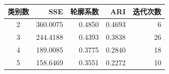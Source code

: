 \begin{tabular}{crrrr}
\toprule
类别数 & SSE & 轮廓系数 & ARI & 迭代次数 \\
\midrule
2 & 360.0075 & 0.4850 & 0.4693 & 6 \\
3 & 244.4188 & 0.4393 & 0.3838 & 26 \\
4 & 189.0085 & 0.3775 & 0.2840 & 18 \\
5 & 158.6469 & 0.3551 & 0.2272 & 10 \\
\bottomrule
\end{tabular}
